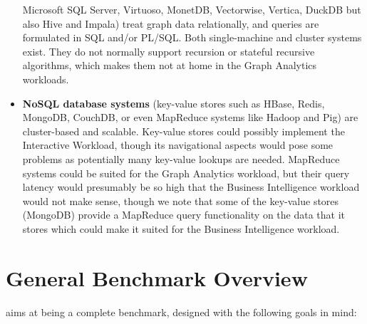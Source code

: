 \begin{itemize}
     Microsoft SQL Server, Virtuoso, MonetDB, Vectorwise, Vertica, DuckDB but also Hive and
     Impala) treat graph data relationally, and queries are formulated in SQL and/or
     PL/SQL. Both single-machine and cluster systems exist. They do not
     normally support recursion or stateful recursive algorithms, which makes     them not at home in the Graph Analytics workloads.
 \item \textbf{NoSQL database systems} (\eg key-value stores such as HBase,
     Redis, MongoDB, CouchDB, or even MapReduce systems like Hadoop and Pig)
     are cluster-based and scalable. Key-value stores could possibly implement
     the Interactive Workload, though its navigational aspects would pose some
     problems as potentially many key-value lookups are needed. MapReduce
     systems could be suited for the Graph Analytics workload, but their query
     latency would presumably be so high that the Business Intelligence
     workload would not make sense, though we note that some of the key-value
     stores (\eg MongoDB) provide a MapReduce query functionality on the data
     that it stores which could make it suited for the Business Intelligence workload.
\end{itemize}


\section{General Benchmark Overview}

\ldbcsnb aims at being a complete benchmark, designed with the following goals in mind:

